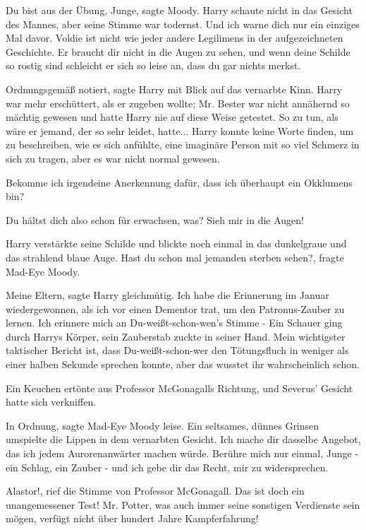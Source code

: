 \glqq Du bist aus der Übung, Junge\grqq{}, sagte Moody. Harry schaute nicht in
das Gesicht des Mannes, aber seine Stimme war todernst. \glqq Und ich warne dich
nur ein einziges Mal davor. Voldie ist nicht wie jeder andere Legilimens in der
aufgezeichneten Geschichte. Er braucht dir nicht in die Augen zu sehen, und wenn
deine Schilde so rostig sind schleicht er sich so leise an, dass du gar nichts
merkst.\grqq{}

\glqq Ordnungsgemäß notiert\grqq{}, sagte Harry mit Blick auf das vernarbte
Kinn. Harry war mehr erschüttert, als er zugeben wollte; Mr. Bester war nicht
annähernd so mächtig gewesen und hatte Harry nie auf diese Weise getestet. So zu
tun, als wäre er jemand, der so sehr leidet, hatte... Harry konnte keine Worte
finden, um zu beschreiben, wie es sich anfühlte, eine imaginäre Person mit so
viel Schmerz in sich zu tragen, aber es war nicht normal gewesen.

\glqq Bekomme ich irgendeine Anerkennung dafür, dass ich überhaupt ein Okklumens
bin?\grqq{}

\glqq Du hältst dich also schon für erwachsen, was? Sieh mir in die
Augen!\grqq{}

Harry verstärkte seine Schilde und blickte noch einmal in das dunkelgraue und
das strahlend blaue Auge. \glqq Hast du schon mal jemanden sterben
sehen?\grqq{}, fragte Mad-Eye Moody.

\glqq Meine Eltern\grqq{}, sagte Harry gleichmütig. \glqq Ich habe die
Erinnerung im Januar wiedergewonnen, als ich vor einen Dementor trat, um den
Patronus-Zauber zu lernen. Ich erinnere mich an Du-weißt-schon-wen's Stimme
-\grqq{} Ein Schauer ging durch Harrys Körper, sein Zauberstab zuckte in seiner
Hand. \glqq Mein wichtigster taktischer Bericht ist, dass Du-weißt-schon-wer den
Tötungsfluch in weniger als einer halben Sekunde sprechen konnte, aber das
wusstet ihr wahrscheinlich schon.\grqq{}

Ein Keuchen ertönte aus Professor McGonagalls Richtung, und Severus' Gesicht
hatte sich verkniffen.

\glqq In Ordnung\grqq{}, sagte Mad-Eye Moody leise. Ein seltsames, dünnes
Grinsen umspielte die Lippen in dem vernarbten Gesicht. \glqq Ich mache dir
dasselbe Angebot, das ich jedem Aurorenanwärter machen würde. Berühre mich nur
einmal, Junge - ein Schlag, ein Zauber - und ich gebe dir das Recht, mir zu
widersprechen.\grqq{}

\glqq Alastor!\grqq{}, rief die Stimme von Professor McGonagall. \glqq Das ist
doch ein unangemessener Test! Mr. Potter, was auch immer seine sonstigen
Verdienste sein mögen, verfügt nicht über hundert Jahre Kampferfahrung!\grqq{}

